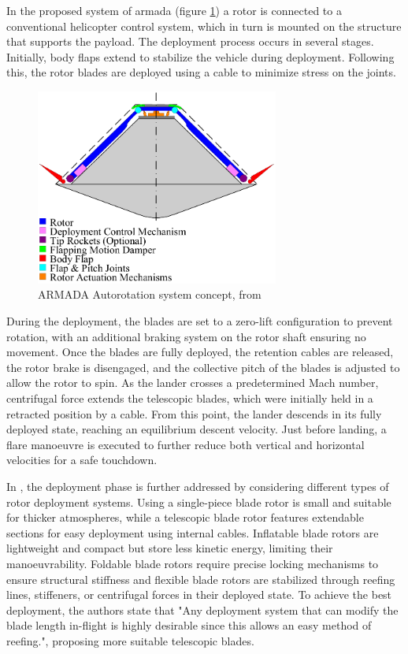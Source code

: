  In the proposed system of \gls{armada} (figure \ref{fig:armada_concept}) a rotor is connected to a conventional helicopter control system, which in turn is mounted on the structure that supports the payload. The deployment process occurs in several stages. Initially, body flaps extend to stabilize the vehicle during deployment. Following this, the rotor blades are deployed using a cable to minimize stress on the joints. 

\begin{figure}[!htb]
    \centering
    \includegraphics[width=8cm]{Figures/literature_review/armada_concept_vehicle.png}
    \caption{ARMADA Autorotation system concept, from \cite{noauthor_armada_nodate} }
    \label{fig:armada_concept}
\end{figure}

During the deployment, the blades are set to a zero-lift configuration to prevent rotation, with an additional braking system on the rotor shaft ensuring no movement. Once the blades are fully deployed, the retention cables are released, the rotor brake is disengaged, and the collective pitch of the blades is adjusted to allow the rotor to spin. As the lander crosses a predetermined Mach number, centrifugal force extends the telescopic blades, which were initially held in a retracted position by a cable. From this point, the lander descends in its fully deployed state, reaching an equilibrium descent velocity. Just before landing, a flare manoeuvre is executed to further reduce both vertical and horizontal velocities for a safe touchdown.

In \cite{noauthor_armada_nodate}, the deployment phase is further addressed by considering different types of rotor deployment systems. Using a single-piece blade rotor is small and suitable for thicker atmospheres, while a telescopic blade rotor features extendable sections for easy deployment using internal cables. Inflatable blade rotors are lightweight and compact but store less kinetic energy, limiting their manoeuvrability. Foldable blade rotors require precise locking mechanisms to ensure structural stiffness and flexible blade rotors are stabilized through reefing lines, stiffeners, or centrifugal forces in their deployed state. To achieve the best deployment, the authors state that "Any deployment system that can modify the blade length in-flight is highly desirable since this allows an easy method of reefing.", proposing more suitable telescopic blades.

